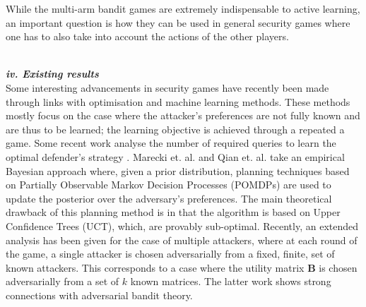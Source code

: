 
While the multi-arm bandit games are extremely indispensable to active learning, an important question is how they can be used in general security games where one has to also take into account the actions of the other players.


\noindent \textbf{\textit{\\iv. Existing results}}\\
Some interesting advancements in security games have recently been  made through links with optimisation and machine learning methods. 
These methods mostly focus on the case where the attacker's preferences are not fully known and are thus to be learned; the learning objective is achieved through a repeated a game. Some recent work analyse the number of required queries to learn the optimal defender's strategy \cite{blum2014learning, letchford2009learning}. 
Marecki et. al. and Qian et. al.\cite{Marecki12PR, qian2014online} take an empirical Bayesian approach where, given a prior distribution, planning techniques based on Partially Observable Markov Decision Processes (POMDPs) are used to update the posterior over the adversary's preferences.
The main theoretical drawback of this planning method is in that the algorithm is based on Upper Confidence Trees (UCT), which, are provably sub-optimal\cite{munos2014bandits}. 
Recently, an extended analysis has been given\cite{Balcan15CR} for the case of multiple attackers, where at each round of the game, a single attacker is chosen adversarially from a fixed, finite, set of known attackers. This corresponds to a case where the utility matrix $\boldsymbol B$ is chosen adversarially from a set of $k$ known matrices.  The latter work shows strong connections with adversarial bandit theory. 

